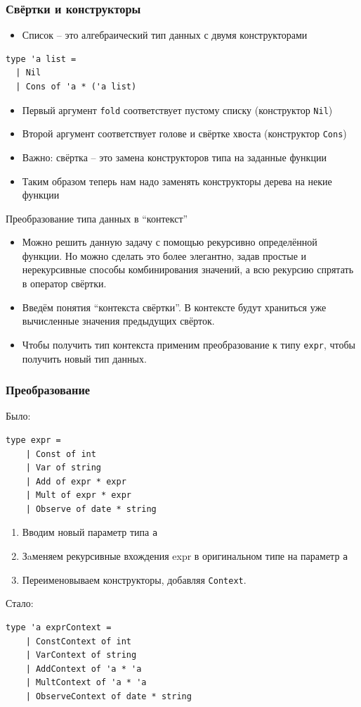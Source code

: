 \documentclass{beamer}
\begin{document}
\begin{frame}[fragile]
\frametitle{Свёртки и конструкторы}

\begin{itemize}
\item
  Список -- это алгебраический тип данных с двумя конструкторами
\end{itemize}
\begin{lstlisting}
type 'a list =
  | Nil
  | Cons of 'a * ('a list)
\end{lstlisting}
\begin{itemize}
\item
  Первый аргумент \texttt{fold} соответствует пустому списку
  (конструктор \texttt{Nil})
\item
  Второй аргумент соответствует голове и свёртке хвоста (конструктор
  \texttt{Cons})
\item
  Важно: свёртка -- это замена конструкторов типа на заданные функции
\item
  Таким образом теперь нам надо заменять конструкторы дерева на некие
  функции
\end{itemize}
\end{frame}

\begin{frame}{Преобразование типа данных в ``контекст''}
\begin{itemize}
\item
  Можно решить данную задачу с помощью рекурсивно определённой функции.
  Но можно сделать это более элегантно, задав простые и нерекурсивные
  способы комбинирования значений, а всю рекурсию спрятать в оператор
  свёртки.
\item
  Введём понятия ``контекста свёртки''. В контексте будут храниться уже
  вычисленные значения предыдущих свёрток.
\item
  Чтобы получить тип контекста применим преобразование к типу
  \texttt{expr}, чтобы получить новый тип данных.
\end{itemize}
\end{frame}

\begin{frame}[fragile]
\frametitle{Преобразование}

Было:
\begin{lstlisting}
type expr =
    | Const of int
    | Var of string
    | Add of expr * expr
    | Mult of expr * expr
    | Observe of date * string
\end{lstlisting}
\begin{enumerate}[1.]
\item
  Вводим новый параметр типа \texttt{a}
\item
  Зaменяем рекурсивные вхождения expr в оригинальном типе на параметр
  \texttt{a}
\item
  Переименовываем конструкторы, добавляя \texttt{Context}.
\end{enumerate}
Стало:
\begin{lstlisting}
type 'a exprContext =
    | ConstContext of int
    | VarContext of string
    | AddContext of 'a * 'a
    | MultContext of 'a * 'a
    | ObserveContext of date * string
\end{lstlisting}
\end{frame}
\end{document}
